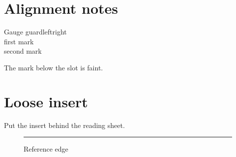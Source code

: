 \documentclass{article}
\begin{document}
\section*{Alignment notes}

\noindent Gauge%
guard\quad left\hspace{12mm}right\\[3pt]
first mark\\second mark%
\par\vspace{9mm}The mark below the slot is faint.
\newpage\section*{Loose insert}Put the insert behind the reading sheet.
\begin{figure}[p]\centering\rule{40mm}{1mm}\caption{Reference edge}\end{figure}\clearpage
\end{document}
